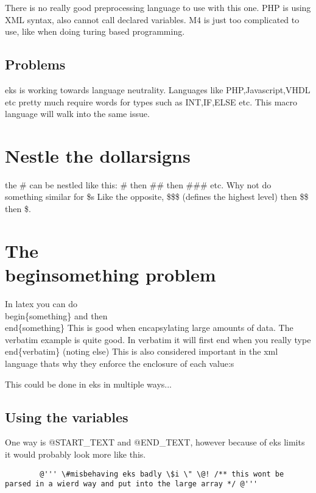 \documentclass{book}
\begin{document}
		There is no really good preprocessing language to use with this one. PHP is using XML syntax, also cannot call declared variables. M4 is just too complicated to use, like when doing turing based programming.
	
	\subsection{Problems}
	
		eks is working towards language neutrality. Languages like PHP,Javascript,VHDL etc pretty much require words for types such as INT,IF,ELSE etc. This macro language will walk into the same issue.
	
	\section{Nestle the dollarsigns}
	
	the \# can be nestled like this: \# then \#\# then \#\#\# etc.
	Why not do something similar for \$s
	Like the opposite, \$\$\$ (defines the highest level) then \$\$ then \$. 
	
	\section{The \\begin{something} problem}
	
		In latex you can do \\begin\{something\} and then \\end\{something\} This is good when encapsylating large amounts of data.
		The verbatim example is quite good. In verbatim it will first end when you really type \\end\{verbatim\} (noting else)
		This is also considered important in the xml language thats why they enforce the enclosure of each \<value\>:s
		
		This could be done in eks in multiple ways...
		
		\subsection{Using the variables}
		
		One way is @START_TEXT and @END_TEXT, however because of eks limits it would probably look more like this.
		
		\begin{verbatim}
		@''' \#misbehaving eks badly \$i \" \@! /** this wont be parsed in a wierd way and put into the large array */ @'''
		\end{verbatim}
		
\end{document}
